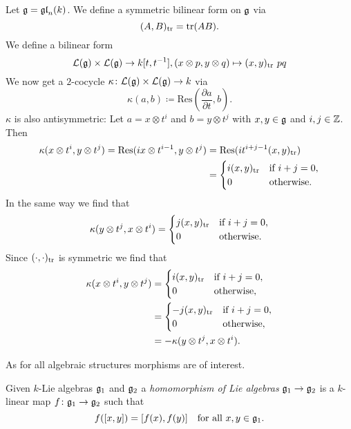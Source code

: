 \begin{expl}
 Let $\mathfrak{g} = \mathfrak{gl}_n(k)$. We define a symmetric bilinear form on $\mathfrak{g}$ via
 \[
  (A,B)_{\operatorname{tr}} = \operatorname{tr}(AB).
 \]
 We define a bilinear form
 \[
  \mathcal{L}(\mathfrak{g}) \times \mathcal{L}(\mathfrak{g}) \to k[t,t^{-1}],
  (x \otimes p, y \otimes q) \mapsto (x,y)_{\operatorname{tr}}\ pq
 \]
 We now get a $2$-cocycle $\kappa \colon \mathcal{L}(\mathfrak{g}) \times \mathcal{L}(\mathfrak{g}) \to k$ via
 \[
  \kappa(a,b) \coloneqq \mathrm{Res}\left(\frac{\partial a}{\partial t}, b\right).
 \]
 $\kappa$ is also antisymmetric: Let $a = x \otimes t^i$ and $b = y \otimes t^j$ with $x,y \in \mathfrak{g}$ and $i,j \in \mathbb{Z}$. Then
 \begin{align*}
  \kappa(x \otimes t^i, y \otimes t^j)
  = \mathrm{Res}(i x \otimes t^{i-1}, y \otimes t^j)
  &= \mathrm{Res}(i t^{i+j-1} (x,y)_{\operatorname{tr}}) \\
  &=
  \begin{cases}
   i (x,y)_{\operatorname{tr}} & \text{if $i+j = 0$}, \\
               0 & \text{otherwise}.
  \end{cases}
 \end{align*}
 In the same way we find that
 \[
  \kappa(y \otimes t^j, x \otimes t^i) =
  \begin{cases}
   j (x,y)_{\operatorname{tr}} & \text{if $i+j = 0$}, \\
               0 & \text{otherwise}.
  \end{cases}
 \]
 Since $(\cdot,\cdot)_{\operatorname{tr}}$ is symmetric we find that
 \begin{align*}
  \kappa(x \otimes t^i, y \otimes t^j)
  &=
  \begin{cases}
   i (x,y)_{\operatorname{tr}} & \text{if $i+j = 0$}, \\
               0 & \text{otherwise},
  \end{cases} \\
  &=
  \begin{cases}
   -j (x,y)_{\operatorname{tr}} & \text{if $i+j = 0$}, \\
                0 & \text{otherwise},
  \end{cases} \\
  &=
  -\kappa(y \otimes t^j, x \otimes t^i).
 \end{align*}
\end{expl}


As for all algebraic structures morphisms are of interest.


\begin{defi}
 Given $k$-Lie algebras $\mathfrak{g}_1$ and $\mathfrak{g}_2$ a \emph{homomorphism of Lie algebras} $\mathfrak{g}_1 \to \mathfrak{g}_2$ is a $k$-linear map $f \colon \mathfrak{g}_1 \to \mathfrak{g}_2$ such that
 \[
  f([x,y]) =[f(x),f(y)] \quad \text{for all $x,y \in \mathfrak{g}_1$}.
 \]
\end{defi}


